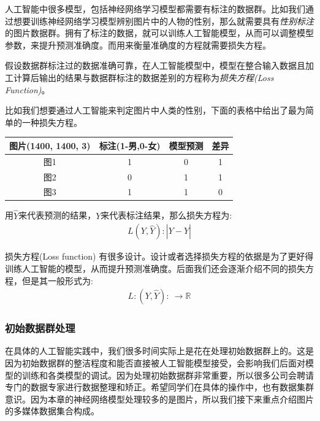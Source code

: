 \documentclass[12pt]{article}
\newcommand{\rn}{\mathbb{R}}
\numberwithin{figure}{section}
\numberwithin{equation}{section}
\begin{document}
人工智能中很多模型，包括神经网络学习模型都需要有标注的数据群。比如我们通过想要训练神经网络学习模型辨别图片中的人物的性别，那么就需要具有\textit{性别标注}的图片数据群。拥有了标注的数据，就可以训练人工智能模型，从而可以调整模型参数，来提升预测准确度。而用来衡量准确度的方程就需要损失方程。

\begin{definition}
	假设数据群标注过的数据准确可靠，在人工智能模型中，模型在整合输入数据且加工计算后输出的结果与数据群标注的数据差别的方程称为\textit{损失方程(Loss Function)}。
\end{definition}

\begin{example}
比如我们想要通过人工智能来判定图片中人类的性别，下面的表格中给出了最为简单的一种损失方程。
\begin{table}[H]
	\centering
	\renewcommand{\arraystretch}{1.5}
	\begin{tabular}{cccc}
	\hline 
		图片(1400, 1400, 3) & 标注(1-男,0-女) & 模型预测 & 差异\\
		\hline 
		图1 & 1 & 0 & 1 \\
		图2 & 0 & 1 & 1 \\
		图3 & 1 & 1 & 0 \\
		\hline 
	\end{tabular}
\end{table}
用$\hat{Y}$来代表预测的结果，$Y$来代表标注结果，那么损失方程为:
\begin{align*}
	L(Y, \hat{Y}): |Y-\hat{Y}| 
\end{align*}
\end{example}

\begin{remark}
损失方程(Loss function) 有很多设计。设计或者选择损失方程的依据是为了更好得训练人工智能的模型，从而提升预测准确度。后面我们还会逐渐介绍不同的损失方程，但是其一般形式为:
\begin{align*}
	L: (Y, \hat{Y}): \ \to \rn 
\end{align*}	
\end{remark}

\subsubsection{初始数据群处理}

在具体的人工智能实践中，我们很多时间实际上是花在处理初始数据群上的。这是因为初始数据群的整洁程度和能否直接被人工智能模型接受，会影响我们后面对模型的训练和各类模型的调试。因为处理初始数据群非常重要，所以很多公司会聘请专门的数据专家进行数据整理和矫正。希望同学们在具体的操作中，也有数据集群意识。因为本章的神经网络模型处理较多的是图片，所以我们接下来重点介绍图片的多媒体数据集合构成。
\end{document}
